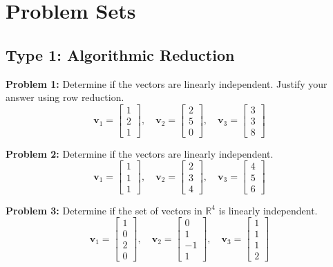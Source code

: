 \documentclass[12pt]{article}
\begin{document}
\newpage

\section{Problem Sets}

\subsection*{Type 1: Algorithmic Reduction}
\textbf{Problem 1:} Determine if the vectors are linearly independent. Justify your answer using row reduction.
$$ \mathbf{v}_1 = \begin{bmatrix} 1 \\ 2 \\ 1 \end{bmatrix}, \quad \mathbf{v}_2 = \begin{bmatrix} 2 \\ 5 \\ 0 \end{bmatrix}, \quad \mathbf{v}_3 = \begin{bmatrix} 3 \\ 3 \\ 8 \end{bmatrix} $$

\textbf{Problem 2:} Determine if the vectors are linearly independent.
$$ \mathbf{v}_1 = \begin{bmatrix} 1 \\ 1 \\ 1 \end{bmatrix}, \quad \mathbf{v}_2 = \begin{bmatrix} 2 \\ 3 \\ 4 \end{bmatrix}, \quad \mathbf{v}_3 = \begin{bmatrix} 4 \\ 5 \\ 6 \end{bmatrix} $$

\textbf{Problem 3:} Determine if the set of vectors in $\mathbb{R}^4$ is linearly independent.
$$ \mathbf{v}_1 = \begin{bmatrix} 1 \\ 0 \\ 2 \\ 0 \end{bmatrix}, \quad \mathbf{v}_2 = \begin{bmatrix} 0 \\ 1 \\ -1 \\ 1 \end{bmatrix}, \quad \mathbf{v}_3 = \begin{bmatrix} 1 \\ 1 \\ 1 \\ 2 \end{bmatrix} $$
\end{document}
